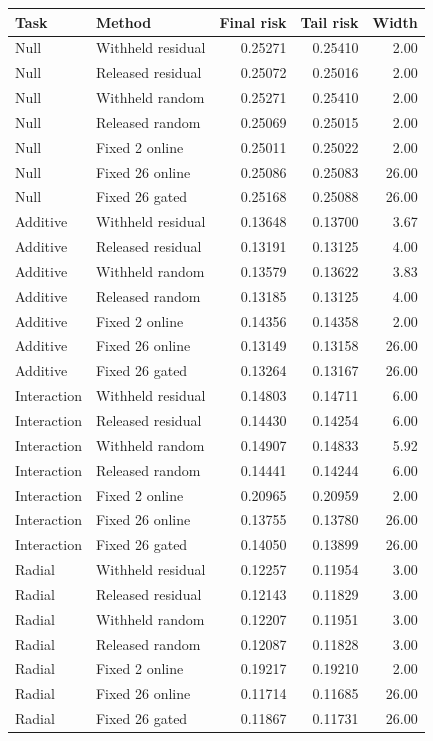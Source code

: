 \begin{tabular}{llrrr}
\toprule
Task & Method & Final risk & Tail risk & Width \\
\midrule
Null & Withheld residual & 0.25271 & 0.25410 & 2.00 \\
Null & Released residual & 0.25072 & 0.25016 & 2.00 \\
Null & Withheld random & 0.25271 & 0.25410 & 2.00 \\
Null & Released random & 0.25069 & 0.25015 & 2.00 \\
Null & Fixed 2 online & 0.25011 & 0.25022 & 2.00 \\
Null & Fixed 26 online & 0.25086 & 0.25083 & 26.00 \\
Null & Fixed 26 gated & 0.25168 & 0.25088 & 26.00 \\
Additive & Withheld residual & 0.13648 & 0.13700 & 3.67 \\
Additive & Released residual & 0.13191 & 0.13125 & 4.00 \\
Additive & Withheld random & 0.13579 & 0.13622 & 3.83 \\
Additive & Released random & 0.13185 & 0.13125 & 4.00 \\
Additive & Fixed 2 online & 0.14356 & 0.14358 & 2.00 \\
Additive & Fixed 26 online & 0.13149 & 0.13158 & 26.00 \\
Additive & Fixed 26 gated & 0.13264 & 0.13167 & 26.00 \\
Interaction & Withheld residual & 0.14803 & 0.14711 & 6.00 \\
Interaction & Released residual & 0.14430 & 0.14254 & 6.00 \\
Interaction & Withheld random & 0.14907 & 0.14833 & 5.92 \\
Interaction & Released random & 0.14441 & 0.14244 & 6.00 \\
Interaction & Fixed 2 online & 0.20965 & 0.20959 & 2.00 \\
Interaction & Fixed 26 online & 0.13755 & 0.13780 & 26.00 \\
Interaction & Fixed 26 gated & 0.14050 & 0.13899 & 26.00 \\
Radial & Withheld residual & 0.12257 & 0.11954 & 3.00 \\
Radial & Released residual & 0.12143 & 0.11829 & 3.00 \\
Radial & Withheld random & 0.12207 & 0.11951 & 3.00 \\
Radial & Released random & 0.12087 & 0.11828 & 3.00 \\
Radial & Fixed 2 online & 0.19217 & 0.19210 & 2.00 \\
Radial & Fixed 26 online & 0.11714 & 0.11685 & 26.00 \\
Radial & Fixed 26 gated & 0.11867 & 0.11731 & 26.00 \\
\bottomrule
\end{tabular}
